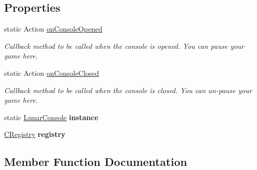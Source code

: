\subsection*{Properties}
\begin{DoxyCompactItemize}
\item 
static Action \mbox{\hyperlink{class_lunar_console_plugin_1_1_lunar_console_ad80d6876172ef84b7a2d4a7439c8ebeb}{on\+Console\+Opened}}
\begin{DoxyCompactList}\small\item\em Callback method to be called when the console is opened. You can pause your game here. \end{DoxyCompactList}\item 
static Action \mbox{\hyperlink{class_lunar_console_plugin_1_1_lunar_console_a3ba133206c6a1f45bb1ee19429bcd313}{on\+Console\+Closed}}
\begin{DoxyCompactList}\small\item\em Callback method to be called when the console is closed. You can un-\/pause your game here. \end{DoxyCompactList}\item 
\mbox{\label{class_lunar_console_plugin_1_1_lunar_console_a1afebc241a2bc3a00a71f1aa69d77c2f}} 
static \mbox{\hyperlink{class_lunar_console_plugin_1_1_lunar_console}{Lunar\+Console}} {\bfseries instance}
\item 
\mbox{\label{class_lunar_console_plugin_1_1_lunar_console_a21f09fd3f92ef24d596c1dda0a27943b}} 
\mbox{\hyperlink{class_lunar_console_plugin_internal_1_1_c_registry}{C\+Registry}} {\bfseries registry}
\end{DoxyCompactItemize}


\subsection{Member Function Documentation}
\mbox{\label{class_lunar_console_plugin_1_1_lunar_console_a886f0926aaa4792a3313e2b7bf08e0e4}} 
